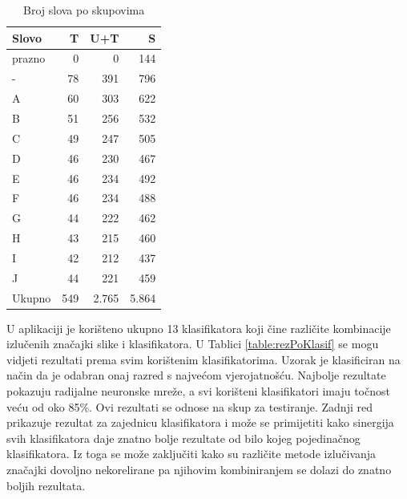 \documentclass[a4paper,twocolumn,dvipdfm]{article}
\begin{document}
\begin{table}[htb]
\centering
\begin{tabular}{lrrr} \toprule
Slovo & T & U+T & S \\ \midrule
prazno & 0 & 0 & 144 \\
- & 78 & 391 & 796 \\
A & 60 & 303 & 622 \\
B & 51 & 256 & 532 \\
C & 49 & 247 & 505 \\
D & 46 & 230 & 467 \\
E & 46 & 234 & 492 \\
F & 46 & 234 & 488 \\
G & 44 & 222 & 462 \\
H & 43 & 215 & 460 \\
I & 42 & 212 & 437 \\
J & 44 & 221 & 459 \\ \midrule
Ukupno & 549 & 2.765 & 5.864 \\ \bottomrule
\end{tabular}
\caption{Broj slova po skupovima}
\label{table:brojSlova}
\end{table}

U aplikaciji je korišteno ukupno 13 klasifikatora koji čine različite
kombinacije izlučenih značajki slike i klasifikatora. U Tablici
\ref{table:rezPoKlasif} se mogu vidjeti rezultati prema svim korištenim
klasifikatorima. Uzorak je klasificiran na način da je odabran onaj razred s
najvećom vjerojatnošću. Najbolje rezultate pokazuju radijalne neuronske mreže, a
svi korišteni klasifikatori imaju točnost veću od oko 85\%. Ovi rezultati se
odnose na skup za testiranje. Zadnji red prikazuje rezultat za zajednicu
klasifikatora i može se primijetiti kako sinergija svih klasifikatora daje
znatno bolje rezultate od bilo kojeg pojedinačnog klasifikatora. Iz toga se može
zaključiti kako su različite metode izlučivanja značajki dovoljno nekorelirane
pa njihovim kombiniranjem se dolazi do znatno boljih rezultata.
\end{document}

